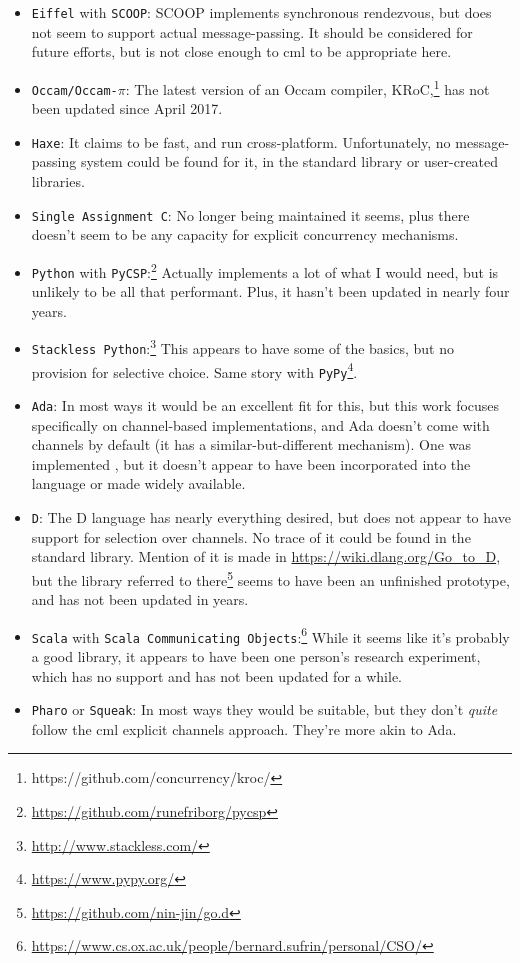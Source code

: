 \begin{itemize}
    \item \texttt{Eiffel} with \texttt{SCOOP}:  SCOOP implements synchronous rendezvous, but does not seem to support actual message-passing.  It should be considered for future efforts, but is not close enough to \gls{cml} to be appropriate here.
    \item \texttt{Occam/Occam-\(\pi\)}:  The latest version of an Occam compiler, KRoC,\footnote{https://github.com/concurrency/kroc/} has not been updated since April 2017.
    \item \texttt{Haxe}:  It claims to be fast, and run cross-platform.  Unfortunately, no message-passing system could be found for it, in the standard library or user-created libraries.
    \item \texttt{Single Assignment C}:  No longer being maintained it seems, plus there doesn't seem to be any capacity for explicit concurrency mechanisms.
    \item \texttt{Python} with \texttt{PyCSP}:\footnote{\url{https://github.com/runefriborg/pycsp}}  Actually implements a lot of what I would need, but is unlikely to be all that performant.  Plus, it hasn't been updated in nearly four years.
    \item \texttt{Stackless Python}:\footnote{\url{http://www.stackless.com/}} This appears to have some of the basics, but no provision for selective choice.  Same story with \texttt{PyPy}\footnote{\url{https://www.pypy.org/}}.
    \item \texttt{Ada}:  In most ways it would be an excellent fit for this, but this work focuses specifically on channel-based implementations, and Ada doesn't come with channels by default (it has a similar-but-different mechanism).  One was implemented \cite{Atiya2005}, but it doesn't appear to have been incorporated into the language or made widely available.
    \item \texttt{D}:  The D language has nearly everything desired, but does not appear to have support for selection over channels.  No trace of it could be found in the standard library.  Mention of it is made in \url{https://wiki.dlang.org/Go_to_D}, but the library referred to there\footnote{\url{https://github.com/nin-jin/go.d}} seems to have been an unfinished prototype, and has not been updated in years.
    \item \texttt{Scala} with \texttt{Scala Communicating Objects}:\footnote{\url{https://www.cs.ox.ac.uk/people/bernard.sufrin/personal/CSO/}}  While it seems like it's probably a good library, it appears to have been one person's research experiment, which has no support and has not been updated for a while.
    \item \texttt{Pharo} or \texttt{Squeak}:  In most ways they would be suitable, but they don't \emph{quite} follow the \gls{cml} explicit channels approach.  They're more akin to Ada.
\end{itemize}